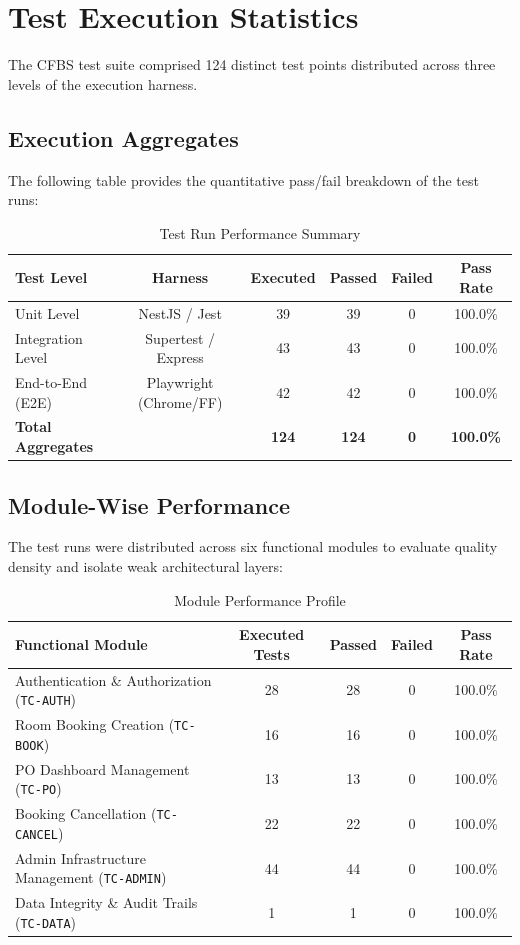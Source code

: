 \documentclass[11pt,a4paper]{article}
\begin{document}
\section{Test Execution Statistics}
The CFBS test suite comprised 124 distinct test points distributed across three levels of the execution harness.

\subsection{Execution Aggregates}
The following table provides the quantitative pass/fail breakdown of the test runs:

\begin{table}[h]
\centering
\caption{Test Run Performance Summary}
\vspace{0.2cm}
\begin{tabularx}{\textwidth}{lccccc}
\toprule
\textbf{Test Level} & \textbf{Harness} & \textbf{Executed} & \textbf{Passed} & \textbf{Failed} & \textbf{Pass Rate} \\ \midrule
Unit Level & NestJS / Jest & 39 & 39 & 0 & 100.0\% \\
Integration Level & Supertest / Express & 43 & 43 & 0 & 100.0\% \\
End-to-End (E2E) & Playwright (Chrome/FF) & 42 & 42 & 0 & 100.0\% \\ \midrule
\textbf{Total Aggregates} & & \textbf{124} & \textbf{124} & \textbf{0} & \textbf{100.0\%} \\
\bottomrule
\end{tabularx}
\end{table}

\subsection{Module-Wise Performance}
The test runs were distributed across six functional modules to evaluate quality density and isolate weak architectural layers:

\begin{table}[h]
\centering
\caption{Module Performance Profile}
\vspace{0.2cm}
\begin{tabularx}{\textwidth}{lcccc}
\toprule
\textbf{Functional Module} & \textbf{Executed Tests} & \textbf{Passed} & \textbf{Failed} & \textbf{Pass Rate} \\ \midrule
Authentication \& Authorization (\texttt{TC-AUTH}) & 28 & 28 & 0 & 100.0\% \\
Room Booking Creation (\texttt{TC-BOOK}) & 16 & 16 & 0 & 100.0\% \\
PO Dashboard Management (\texttt{TC-PO}) & 13 & 13 & 0 & 100.0\% \\
Booking Cancellation (\texttt{TC-CANCEL}) & 22 & 22 & 0 & 100.0\% \\
Admin Infrastructure Management (\texttt{TC-ADMIN}) & 44 & 44 & 0 & 100.0\% \\
Data Integrity \& Audit Trails (\texttt{TC-DATA}) & 1 & 1 & 0 & 100.0\% \\
\bottomrule
\end{tabularx}
\end{table}
\end{document}
